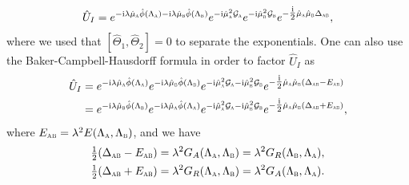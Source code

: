 \documentclass[letterpaper,12pt,titlepage,oneside,final]{book}
\newcommand{\ii}{\mathrm{i}}
\newcommand{\tc}[1]{\textsc{#1}}
\begin{document}
\begin{equation}\label{eq:UI2g}
    \hat{U}_I = e^{- \ii \lambda\hat{\mu}_\tc{a}\hat{\phi}(\Lambda_\tc{a}) - \ii \lambda\hat{\mu}_\tc{b} \hat{\phi}(\Lambda_\tc{b})} e^{- \ii \hat{\mu}_\tc{a}^2\mathcal{G}_\tc{a}}e^{- \ii\hat{\mu}_\tc{b}^2 \mathcal{G}_\tc{b}}e^{-  \tfrac{\ii}{2}\hat{\mu}_\tc{a}\hat{\mu}_\tc{b}\Delta_\tc{ab}},
\end{equation}
where we used that $[\hat{\Theta}_1,\hat{\Theta}_2] = 0$ to separate the exponentials. One can also use the Baker-Campbell-Hausdorff formula in order to factor $\hat{U}_I$ as
\begin{align}
    \hat{U}_I &= e^{- \ii \lambda\hat{\mu}_\tc{a}\hat{\phi}(\Lambda_\tc{a})}e^{- \ii \lambda\hat{\mu}_\tc{b} \hat{\phi}(\Lambda_\tc{b})} e^{- \ii \hat{\mu}_\tc{a}^2\mathcal{G}_\tc{a}- \ii\hat{\mu}_\tc{b}^2 \mathcal{G}_\tc{b}}e^{-  \tfrac{\ii}{2}\hat{\mu}_\tc{a}\hat{\mu}_\tc{b}(\Delta_\tc{ab}-E_{\tc{ab}})}\nonumber\\
    &= e^{- \ii \lambda\hat{\mu}_\tc{b} \hat{\phi}(\Lambda_\tc{b})} e^{- \ii \lambda\hat{\mu}_\tc{a}\hat{\phi}(\Lambda_\tc{a})}e^{- \ii \hat{\mu}_\tc{a}^2\mathcal{G}_\tc{a}- \ii\hat{\mu}_\tc{b}^2 \mathcal{G}_\tc{b}}e^{-  \tfrac{\ii}{2}\hat{\mu}_\tc{a}\hat{\mu}_\tc{b}(\Delta_\tc{ab}+E_{\tc{ab}})},\label{eq:BCH2UDW}
\end{align}
where $E_{\tc{ab}} = \lambda^2 E(\Lambda_\tc{a},\Lambda_\tc{b})$, and we have
\begin{align}
    \tfrac{1}{2}(\Delta_{\tc{ab}} - E_\tc{ab}) &= \lambda^2G_A(\Lambda_\tc{a},\Lambda_\tc{b}) = \lambda^2G_R(\Lambda_\tc{b},\Lambda_\tc{a}),\\
    \tfrac{1}{2}(\Delta_{\tc{ab}} + E_\tc{ab}) &= \lambda^2G_R(\Lambda_\tc{a},\Lambda_\tc{b}) = \lambda^2G_A(\Lambda_\tc{b},\Lambda_\tc{a}).
\end{align}
\end{document}
